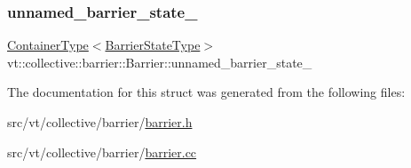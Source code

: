 \mbox{\label{structvt_1_1collective_1_1barrier_1_1_barrier_a83ad5a95d40a7cfcff7782dbc461fb1c}} 
\subsubsection{\texorpdfstring{unnamed\+\_\+barrier\+\_\+state\+\_\+}{unnamed\_barrier\_state\_}}
{\footnotesize\ttfamily \hyperlink{structvt_1_1collective_1_1barrier_1_1_barrier_a84bfbd26a48a1c3bb7272e81245e4873}{Container\+Type}$<$\hyperlink{structvt_1_1collective_1_1barrier_1_1_barrier_a9b612818f7b44ca65f2caee0dee094f3}{Barrier\+State\+Type}$>$ vt\+::collective\+::barrier\+::\+Barrier\+::unnamed\+\_\+barrier\+\_\+state\+\_\+\hspace{0.3cm}{\ttfamily [private]}}



The documentation for this struct was generated from the following files\+:\begin{DoxyCompactItemize}
\item 
src/vt/collective/barrier/\hyperlink{barrier_8h}{barrier.\+h}\item 
src/vt/collective/barrier/\hyperlink{barrier_8cc}{barrier.\+cc}\end{DoxyCompactItemize}
